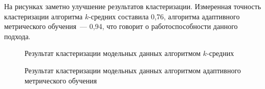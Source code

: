 На рисунках заметно улучшение результатов кластеризации.
Измеренная точность кластеризации алгоритма $k$-средних составила 0,76,
алгоритма адаптивного метрического обучения~--- 0,94, что говорит о работоспособности данного подхода.
\begin{figure} %
    \caption{Результат кластеризации модельных данных алгоритмом $k$-средних}
\end{figure}
\begin{figure} %
    \caption{Результат кластеризации модельных данных алгоритмом адаптивного метрического обучения}
\end{figure}


